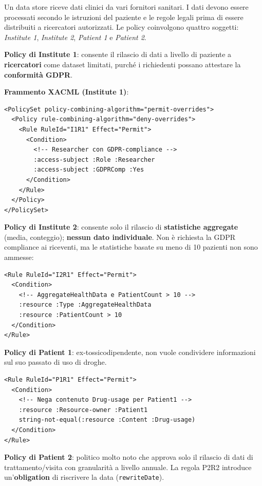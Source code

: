 \documentclass[a4paper,11pt]{article}
\begin{document}
\begin{esempio}
Un data store riceve dati clinici da vari fornitori sanitari. I dati devono essere processati secondo le istruzioni del paziente e le regole legali prima di essere distribuiti a ricercatori autorizzati. Le policy coinvolgono quattro soggetti: \emph{Institute 1}, \emph{Institute 2}, \emph{Patient 1} e \emph{Patient 2}.

\textbf{Policy di Institute 1}: consente il rilascio di dati a livello di paziente a \textbf{ricercatori} come dataset limitati, purch\'{e} i richiedenti possano attestare la \textbf{conformit\`{a} GDPR}.

\noindent\textbf{Frammento XACML (Institute 1)}:
\begin{verbatim}
<PolicySet policy-combining-algorithm="permit-overrides">
  <Policy rule-combining-algorithm="deny-overrides">
    <Rule RuleId="I1R1" Effect="Permit">
      <Condition>
        <!-- Researcher con GDPR-compliance -->
        :access-subject :Role :Researcher
        :access-subject :GDPRComp :Yes
      </Condition>
    </Rule>
  </Policy>
</PolicySet>
\end{verbatim}

\textbf{Policy di Institute 2}: consente solo il rilascio di \textbf{statistiche aggregate} (media, conteggio); \textbf{nessun dato individuale}. Non \`{e} richiesta la GDPR compliance ai riceventi, ma le statistiche basate su meno di 10 pazienti non sono ammesse:
\begin{verbatim}
<Rule RuleId="I2R1" Effect="Permit">
  <Condition>
    <!-- AggregateHealthData e PatientCount > 10 -->
    :resource :Type :AggregateHealthData
    :resource :PatientCount > 10
  </Condition>
</Rule>
\end{verbatim}

\textbf{Policy di Patient 1}: ex-tossicodipendente, non vuole condividere informazioni sul suo passato di uso di droghe.
\begin{verbatim}
<Rule RuleId="P1R1" Effect="Permit">
  <Condition>
    <!-- Nega contenuto Drug-usage per Patient1 -->
    :resource :Resource-owner :Patient1
    string-not-equal(:resource :Content :Drug-usage)
  </Condition>
</Rule>
\end{verbatim}

\textbf{Policy di Patient 2}: politico molto noto che approva solo il rilascio di dati di trattamento/visita con granularit\`{a} a livello annuale. La regola P2R2 introduce un'\textbf{obligation} di riscrivere la data (\texttt{rewriteDate}).


\end{esempio}
\end{document}

